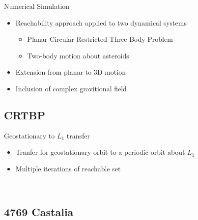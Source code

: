 \begin{frame}{Numerical Simulation}
\begin{itemize}
    \item Reachability approach applied to two dynamical systems
    \begin{itemize}
        \item Planar Circular Restricted Three Body Problem
        \item Two-body motion about asteroids
    \end{itemize}
    \item Extension from planar to 3D motion 
    \item Inclusion of complex gravitional field
\end{itemize}

\end{frame}

\subsection{CRTBP}

\begin{frame}{Geostationary to \( L_1 \) transfer} %
\begin{itemize}
       \item Tranfer for geostationary orbit to a periodic orbit about \( L_1\)
       \item Multiple iterations of reachable set
\end{itemize}

\begin{figure}
       \centering
       \begin{subfigure}[htbp]{0.5\textwidth}
       \end{subfigure}~
       \begin{subfigure}[htbp]{0.5\textwidth}
       \end{subfigure}
       \end{figure}

\end{frame} %

\subsection{4769 Castalia}

